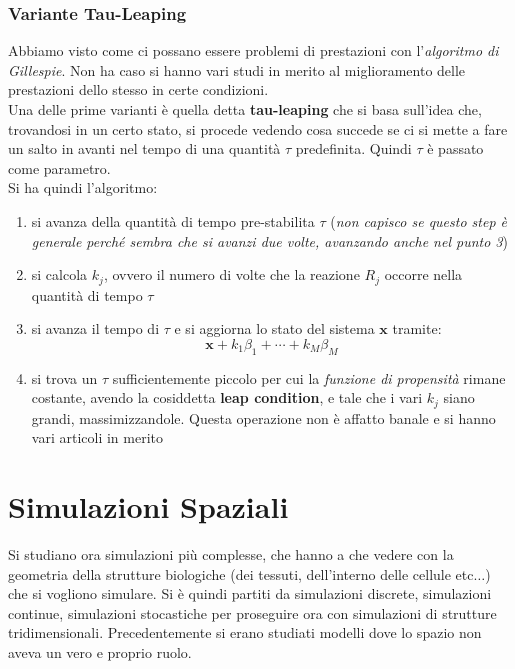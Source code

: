 \documentclass[a4paper,12pt, oneside]{book}
\begin{document}
\subsection{Variante Tau-Leaping}
Abbiamo visto come ci possano essere problemi di prestazioni con
l'\textit{algoritmo di Gillespie}. Non ha caso si hanno vari studi in merito al
miglioramento delle prestazioni dello stesso in certe condizioni.\\
Una delle prime varianti è quella detta \textbf{tau-leaping} che si basa
sull'idea che, trovandosi in un certo stato, si procede vedendo cosa succede se
ci si mette a fare un salto in avanti nel tempo di una quantità $\tau$
predefinita. Quindi $\tau$ è passato come parametro.\\
Si ha quindi l'algoritmo:
\begin{enumerate}
  \item si avanza della quantità di tempo pre-stabilita $\tau$ (\textit{non
    capisco se questo step è generale perché sembra che si avanzi due volte,
    avanzando anche nel punto 3})
  \item si calcola $k_j$, ovvero il numero di volte che la reazione $R_j$
  occorre nella quantità di tempo $\tau$
  \item si avanza il tempo di $\tau$ e si aggiorna lo stato del sistema
  $\mathbf{x}$ tramite:
  \[\mathbf{x}+k_1\beta_1+\cdots+k_M\beta_M\]
  \item si trova un $\tau$ sufficientemente piccolo per cui la
  \textit{funzione di propensità} rimane costante, avendo la cosiddetta
  \textbf{leap condition}, e tale che i vari $k_j$ siano grandi,
  massimizzandole. Questa operazione non è affatto banale e si hanno vari
  articoli in merito
\end{enumerate}
\chapter{Simulazioni Spaziali}
Si studiano ora simulazioni più complesse, che hanno a che vedere con la
geometria della strutture biologiche (dei tessuti, dell'interno delle cellule
etc$\ldots$) che si vogliono simulare. Si è quindi partiti da simulazioni
discrete, simulazioni continue, simulazioni stocastiche per proseguire ora con
simulazioni di strutture tridimensionali. Precedentemente si erano studiati
modelli dove lo spazio non aveva un vero e proprio ruolo.
\end{document}
